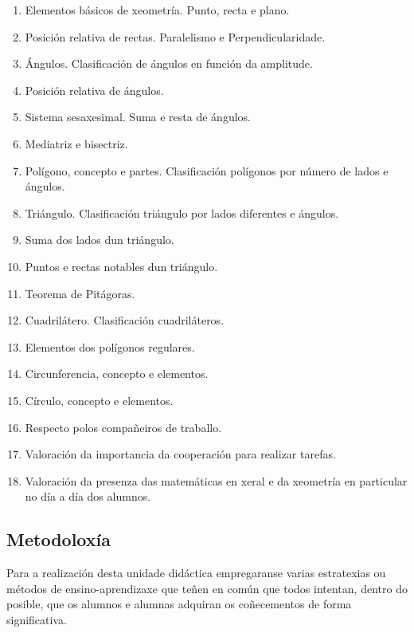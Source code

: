 \begin{enumerate}[label=\bfseries Con\arabic*]
  \item\label{con1} Elementos básicos de xeometría. Punto, recta e plano.
  \item\label{con2} Posición relativa de rectas. Paralelismo e Perpendicularidade.
  \item\label{con3} Ángulos. Clasificación de ángulos en función da amplitude.
  \item\label{con4} Posición relativa de ángulos.
  \item\label{con5} Sistema sesaxesimal. Suma e resta de ángulos.
  \item\label{con6} Mediatriz e bisectriz.
  \item\label{con7} Polígono, concepto e partes. Clasificación polígonos por número de lados e ángulos.
  \item\label{con8} Triángulo. Clasificación triángulo por lados diferentes e ángulos.
  \item\label{con9} Suma dos lados dun triángulo.
  \item\label{con10} Puntos e rectas notables dun triángulo.
  \item\label{con11} Teorema de Pitágoras.
  \item\label{con12} Cuadrilátero. Clasificación cuadriláteros.
  \item\label{con13} Elementos dos polígonos regulares.
  \item\label{con14} Circunferencia, concepto e elementos.
  \item\label{con15} Círculo, concepto e elementos.
  \item\label{con16} Respecto polos compañeiros de traballo.
  \item\label{con16} Valoración da importancia da cooperación para realizar tarefas.
  \item\label{con17} Valoración da presenza das matemáticas en xeral e da xeometría en particular no día a día dos alumnos.
\end{enumerate}

\subsection{Metodoloxía}

Para a realización desta unidade didáctica empregaranse varias estratexias ou métodos de ensino-aprendizaxe que teñen en común que todos intentan, dentro do posible, que os alumnos e alumnas adquiran os coñecementos de forma significativa.

